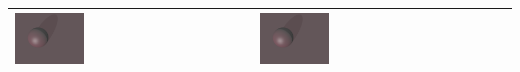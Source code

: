 \begin{table}[H]
\begin{tabular}{p{}p{}p{}}
            \includegraphics[width=0.3\textwidth]{img/sphere_tracing_shadows_128.png} \newline &
            \includegraphics[width=0.3\textwidth]{img/sphere_tracing_shadows_256.png} \newline \\
        \bottomrule
    \end{tabular}
\end{table}
